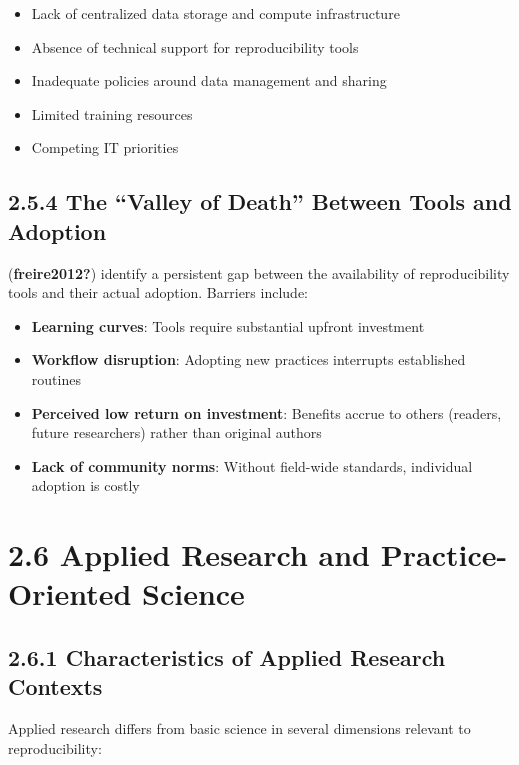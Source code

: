 \documentclass[
  oneside,
  open=any]{scrbook}
\providecommand{\tightlist}{%
  \setlength{\itemsep}{0pt}\setlength{\parskip}{0pt}}\usepackage{longtable,booktabs,array}
\begin{document}
\begin{itemize}
\tightlist
\item
  Lack of centralized data storage and compute infrastructure
\item
  Absence of technical support for reproducibility tools
\item
  Inadequate policies around data management and sharing
\item
  Limited training resources
\item
  Competing IT priorities
\end{itemize}

\subsection{2.5.4 The ``Valley of Death'' Between Tools and
Adoption}\label{the-valley-of-death-between-tools-and-adoption}

(\textbf{freire2012?}) identify a persistent gap between the
availability of reproducibility tools and their actual adoption.
Barriers include:

\begin{itemize}
\tightlist
\item
  \textbf{Learning curves}: Tools require substantial upfront investment
\item
  \textbf{Workflow disruption}: Adopting new practices interrupts
  established routines
\item
  \textbf{Perceived low return on investment}: Benefits accrue to others
  (readers, future researchers) rather than original authors
\item
  \textbf{Lack of community norms}: Without field-wide standards,
  individual adoption is costly
\end{itemize}

\section{2.6 Applied Research and Practice-Oriented
Science}\label{applied-research-and-practice-oriented-science}

\subsection{2.6.1 Characteristics of Applied Research
Contexts}\label{characteristics-of-applied-research-contexts}

Applied research differs from basic science in several dimensions
relevant to reproducibility:
\end{document}
